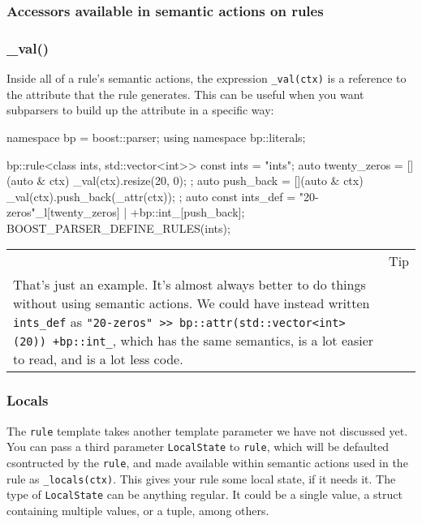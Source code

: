 \subsubsection{Accessors available in semantic actions on rules}

\subsubsection{\_val()}

Inside all of a rule's semantic actions, the expression \texttt{\_val(ctx)} is a reference to the attribute that the rule generates. This can be useful when you want subparsers to build up the attribute in a specific way:

\begin{code}
namespace bp = boost::parser;
using namespace bp::literals;

bp::rule<class ints, std::vector<int>> const ints = "ints";
auto twenty_zeros = [](auto & ctx) { _val(ctx).resize(20, 0); };
auto push_back = [](auto & ctx) { _val(ctx).push_back(_attr(ctx)); };
auto const ints_def = "20-zeros"_l[twenty_zeros] | +bp::int_[push_back];
BOOST_PARSER_DEFINE_RULES(ints);
\end{code}

\begin{longtable}[]{@{}
  >{\raggedright\arraybackslash}p{}
  >{\raggedright\arraybackslash}p{}@{}}
\toprule\noalign{}
\endhead
\bottomrule\noalign{}
\endlastfoot
\begin{minipage}[t]{\linewidth}\raggedright
\end{minipage} & Tip \\
That's just an example. It's almost always better to do things without using semantic actions. We could have instead written \texttt{ints\_def} as \texttt{"20-zeros" >> bp::attr(std::vector<int>(20)) \textbar{} +bp::int\_}, which has the same semantics, is a lot easier to read, and is a lot less code. & \\
\end{longtable}

\subsubsection{Locals}

The \texttt{rule} template takes another template parameter we have not discussed yet. You can pass a third parameter \texttt{LocalState} to \texttt{rule}, which will be defaulted csontructed by the \texttt{rule}, and made available within semantic actions used in the rule as \texttt{\_locals(ctx)}. This gives your rule some local state, if it needs it. The type of \texttt{LocalState} can be anything regular. It could be a single value, a struct containing multiple values, or a tuple, among others.

